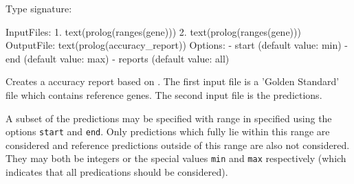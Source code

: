 \vspace{0.7cm}

\begin{description}
Type signature:

\begin{code}
InputFiles:
    1. text(prolog(ranges(gene)))
    2. text(prolog(ranges(gene)))
OutputFile:
    text(prolog(accuracy_report))
Options:
    - start (default value: min)
    - end (default value: max)
    - reports (default value: all)
\end{code}

Creates a accuracy report  based on .
The first input file is a 'Golden Standard' file which contains reference genes.
The second input file is the predictions.

A subset of the predictions may be specified with range in specified using the options \verb$start$ and \verb$end$.
Only predictions which fully lie within this range are considered and reference predictions outside of this range are also not considered.
They may both be integers or the special
values \verb$min$ and \verb$max$ respectively (which indicates that all predications should be considered). 
\end{description}

